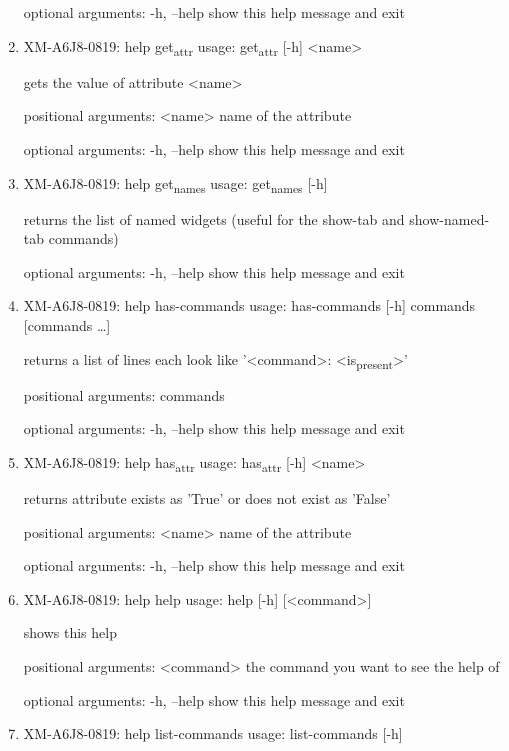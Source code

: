 \documentclass[11pt]{article}
\begin{document}
\begin{enumerate}
optional arguments:
  -h, --help  show this help message and exit

\item XM-A6J8-0819: help get\textsubscript{attr}
\label{sec:org94dcd95}
usage: get\textsubscript{attr} [-h] <name>

gets the value of attribute <name>

positional arguments:
  <name>      name of the attribute

optional arguments:
  -h, --help  show this help message and exit

\item XM-A6J8-0819: help get\textsubscript{names}
\label{sec:org0abb7f4}
usage: get\textsubscript{names} [-h]

returns the list of named widgets (useful for the show-tab and show-named-tab
commands)

optional arguments:
  -h, --help  show this help message and exit

\item XM-A6J8-0819: help has-commands
\label{sec:orge1694ca}
usage: has-commands [-h] commands [commands \ldots{}]

returns a list of lines each look like '<command>: <is\textsubscript{present}>'

positional arguments:
  commands

optional arguments:
  -h, --help  show this help message and exit

\item XM-A6J8-0819: help has\textsubscript{attr}
\label{sec:org794c806}
usage: has\textsubscript{attr} [-h] <name>

returns attribute exists as 'True' or does not exist as 'False'

positional arguments:
  <name>      name of the attribute

optional arguments:
  -h, --help  show this help message and exit

\item XM-A6J8-0819: help help
\label{sec:org12bf915}
usage: help [-h] [<command>]

shows this help

positional arguments:
  <command>   the command you want to see the help of

optional arguments:
  -h, --help  show this help message and exit

\item XM-A6J8-0819: help list-commands
\label{sec:orgee1fb12}
usage: list-commands [-h]


\end{enumerate}
\end{document}

